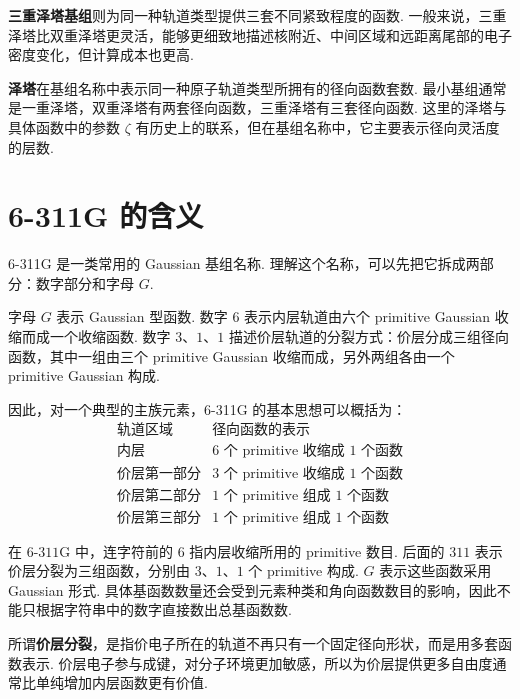 \documentclass[UTF8,11pt,a4paper,openany]{ctexbook}
\newcommand{\term}[1]{\textbf{#1}}
\begin{document}
\term{三重泽塔基组}则为同一种轨道类型提供三套不同紧致程度的函数. 一般来说，三重泽塔比双重泽塔更灵活，能够更细致地描述核附近、中间区域和远距离尾部的电子密度变化，但计算成本也更高. 

\begin{definitionbox}
\term{泽塔}在基组名称中表示同一种原子轨道类型所拥有的径向函数套数. 最小基组通常是一重泽塔，双重泽塔有两套径向函数，三重泽塔有三套径向函数. 这里的泽塔与具体函数中的参数 $\zeta$ 有历史上的联系，但在基组名称中，它主要表示径向灵活度的层数. 
\end{definitionbox}

\section{6-311G 的含义}

6-311G 是一类常用的 Gaussian 基组名称. 理解这个名称，可以先把它拆成两部分：数字部分和字母 $G$. 

字母 $G$ 表示 Gaussian 型函数. 数字 $6$ 表示内层轨道由六个 primitive Gaussian 收缩而成一个收缩函数. 数字 $3$、$1$、$1$ 描述价层轨道的分裂方式：价层分成三组径向函数，其中一组由三个 primitive Gaussian 收缩而成，另外两组各由一个 primitive Gaussian 构成. 

因此，对一个典型的主族元素，6-311G 的基本思想可以概括为：
\[
\begin{array}{c|c}
\text{轨道区域} & \text{径向函数的表示}\\
\hline
\text{内层} & 6\text{ 个 primitive 收缩成 }1\text{ 个函数}\\
\text{价层第一部分} & 3\text{ 个 primitive 收缩成 }1\text{ 个函数}\\
\text{价层第二部分} & 1\text{ 个 primitive 组成 }1\text{ 个函数}\\
\text{价层第三部分} & 1\text{ 个 primitive 组成 }1\text{ 个函数}
\end{array}
\]

\begin{notationbox}
在 $6$-$311$G 中，连字符前的 $6$ 指内层收缩所用的 primitive 数目. 后面的 $311$ 表示价层分裂为三组函数，分别由 $3$、$1$、$1$ 个 primitive 构成. $G$ 表示这些函数采用 Gaussian 形式. 具体基函数数量还会受到元素种类和角向函数数目的影响，因此不能只根据字符串中的数字直接数出总基函数数. 
\end{notationbox}

所谓\term{价层分裂}，是指价电子所在的轨道不再只有一个固定径向形状，而是用多套函数表示. 价层电子参与成键，对分子环境更加敏感，所以为价层提供更多自由度通常比单纯增加内层函数更有价值. 
\end{document}
